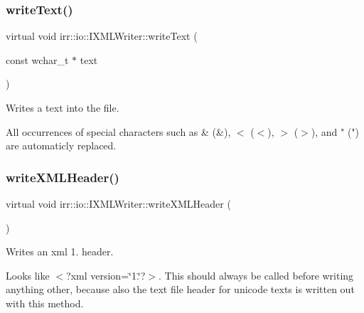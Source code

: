 \subsubsection{\texorpdfstring{write\+Text()}{writeText()}\hspace{0.1cm}{\footnotesize\ttfamily [2/2]}}
{\footnotesize\ttfamily virtual void irr\+::io\+::\+I\+X\+M\+L\+Writer\+::write\+Text (\begin{DoxyParamCaption}\item[{const wchar\+\_\+t $\ast$}]{text }\end{DoxyParamCaption})\hspace{0.3cm}{\ttfamily [pure virtual]}}



Writes a text into the file. 

All occurrences of special characters such as \& (\&), $<$ ($<$), $>$ ($>$), and " (") are automaticly replaced. \mbox{\label{classirr_1_1io_1_1IXMLWriter_a66fd00f6528fc967e53ea2a83f4fbf09}} 
\subsubsection{\texorpdfstring{write\+X\+M\+L\+Header()}{writeXMLHeader()}\hspace{0.1cm}{\footnotesize\ttfamily [1/2]}}
{\footnotesize\ttfamily virtual void irr\+::io\+::\+I\+X\+M\+L\+Writer\+::write\+X\+M\+L\+Header (\begin{DoxyParamCaption}{ }\end{DoxyParamCaption})\hspace{0.3cm}{\ttfamily [pure virtual]}}



Writes an xml 1. header. 

Looks like $<$?xml version=\char`\"{}1.\char`\"{}?$>$. This should always be called before writing anything other, because also the text file header for unicode texts is written out with this method. \mbox{\label{classirr_1_1io_1_1IXMLWriter_a66fd00f6528fc967e53ea2a83f4fbf09}} 

